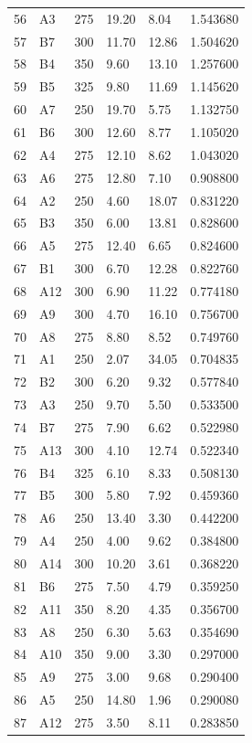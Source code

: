 \begin{longtable}{C{0.07\textwidth}C{0.08\textwidth}C{0.11\textwidth}C{0.18\textwidth}C{0.18\textwidth}C{0.18\textwidth}}
56 & A3 & 275 & 19.20 & 8.04 & 1.543680 \\
57 & B7 & 300 & 11.70 & 12.86 & 1.504620 \\
58 & B4 & 350 & 9.60 & 13.10 & 1.257600 \\
59 & B5 & 325 & 9.80 & 11.69 & 1.145620 \\
60 & A7 & 250 & 19.70 & 5.75 & 1.132750 \\
61 & B6 & 300 & 12.60 & 8.77 & 1.105020 \\
62 & A4 & 275 & 12.10 & 8.62 & 1.043020 \\
63 & A6 & 275 & 12.80 & 7.10 & 0.908800 \\
64 & A2 & 250 & 4.60 & 18.07 & 0.831220 \\
65 & B3 & 350 & 6.00 & 13.81 & 0.828600 \\
66 & A5 & 275 & 12.40 & 6.65 & 0.824600 \\
67 & B1 & 300 & 6.70 & 12.28 & 0.822760 \\
68 & A12 & 300 & 6.90 & 11.22 & 0.774180 \\
69 & A9 & 300 & 4.70 & 16.10 & 0.756700 \\
70 & A8 & 275 & 8.80 & 8.52 & 0.749760 \\
71 & A1 & 250 & 2.07 & 34.05 & 0.704835 \\
72 & B2 & 300 & 6.20 & 9.32 & 0.577840 \\
73 & A3 & 250 & 9.70 & 5.50 & 0.533500 \\
74 & B7 & 275 & 7.90 & 6.62 & 0.522980 \\
75 & A13 & 300 & 4.10 & 12.74 & 0.522340 \\
76 & B4 & 325 & 6.10 & 8.33 & 0.508130 \\
77 & B5 & 300 & 5.80 & 7.92 & 0.459360 \\
78 & A6 & 250 & 13.40 & 3.30 & 0.442200 \\
79 & A4 & 250 & 4.00 & 9.62 & 0.384800 \\
80 & A14 & 300 & 10.20 & 3.61 & 0.368220 \\
81 & B6 & 275 & 7.50 & 4.79 & 0.359250 \\
82 & A11 & 350 & 8.20 & 4.35 & 0.356700 \\
83 & A8 & 250 & 6.30 & 5.63 & 0.354690 \\
84 & A10 & 350 & 9.00 & 3.30 & 0.297000 \\
85 & A9 & 275 & 3.00 & 9.68 & 0.290400 \\
86 & A5 & 250 & 14.80 & 1.96 & 0.290080 \\
87 & A12 & 275 & 3.50 & 8.11 & 0.283850 \\

\end{longtable}
